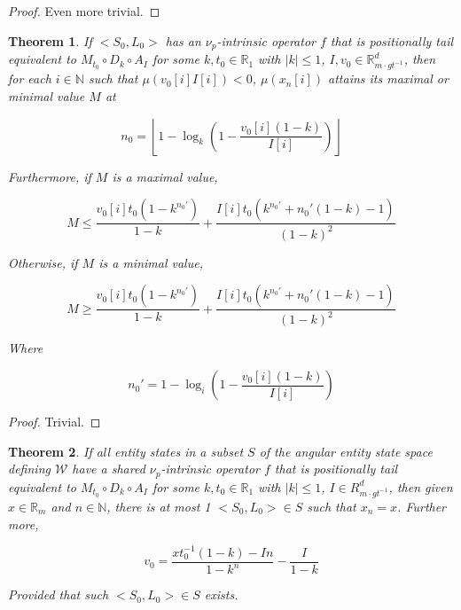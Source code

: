 \documentclass{book}
\newtheorem{theorem}{Theorem}
\theoremstyle{definition}\newtheorem{mechanism}{Mechanism}
\theoremstyle{remark}\newtheorem*{remark}{Remark}
\begin{document}
\begin{proof}
	Even more trivial.
\end{proof}

\begin{theorem}\label{thm:max-disp}
	If $<S_0, L_0>$ has an $\nu_p$-intrinsic operator $f$ that is positionally tail equivalent to $M_{t_0} \circ D_k \circ A_I$ for some $k, t_0\in \mathbb R_1$ with $|k| \le 1$, $I, v_0 \in \mathbb R_{m\cdot gt^{-1}}^d$, then for each $i\in \mathbb N$ such that $\mu(v_0[i]I[i]) < 0$, $\mu(x_n[i])$ attains its maximal or minimal value $M$ at
	
	\begin{equation}
		n_0 = \left\lfloor1 - \log_k\left(1 - \frac{v_0[i](1 - k)}{I[i]}\right)\right\rfloor
	\end{equation}
	
	Furthermore, if $M$ is a maximal value,
	
	\begin{equation}
		M \le \frac{v_0[i]t_0(1 - k^{n_0'})}{1 - k} + \frac{I[i]t_0(k^{n_0'} + n_0'(1 - k) - 1)}{(1 - k)^2}
	\end{equation}
	
	Otherwise, if $M$ is a minimal value, 
	
	\begin{equation}
		M \ge \frac{v_0[i]t_0(1 - k^{n_0'})}{1 - k} + \frac{I[i]t_0(k^{n_0'} + n_0'(1 - k) - 1)}{(1 - k)^2}
	\end{equation}
	
	Where
	
	\begin{equation}
		n_0' = 1 - \log_i\left(1 - \frac{v_0[i](1 - k)}{I[i]}\right)
	\end{equation}
\end{theorem}

\begin{proof}
	Trivial.
\end{proof}

\begin{theorem}\label{thm:inverted-kinematic}
	If all entity states in a subset $S$ of the angular entity state space defining $\mathcal W$ have a shared $\nu_p$-intrinsic operator $f$ that is positionally tail equivalent to $M_{t_0} \circ D_k \circ A_I$ for some $k, t_0\in \mathbb R_1$ with $|k| \le 1$, $I\in R_{m\cdot gt^{-1}}^d$, then given $x\in \mathbb R_{m}$ and $n\in \mathbb N$, there is at most 1 $<S_0, L_0>\in S$ such that $x_n = x$. Further more, 
	
	\begin{equation}
		v_0 = \frac{xt_0^{-1}(1 - k) - In}{1 - k^n} - \frac{I}{1 - k}
	\end{equation}
	
	Provided that such $<S_0, L_0>\in S$ exists.
\end{theorem}
\end{document}
